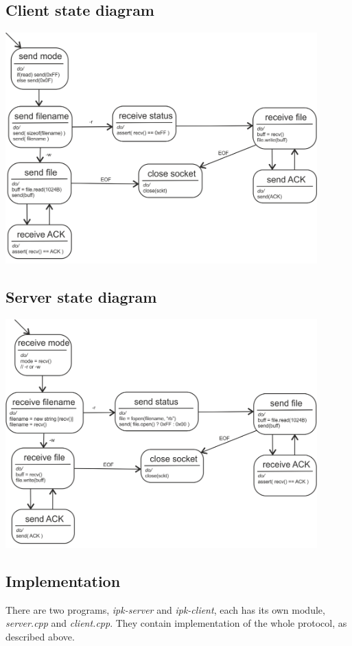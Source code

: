 \documentclass[10pt,a4paper,titlepage]{article}
\begin{document}
\subsection*{Client state diagram}

\includegraphics[width=0.9\textwidth]{state_client.png}

\subsection*{Server state diagram}

\includegraphics[width=0.9\textwidth]{state_server.png}

\subsection*{Implementation}

There are two programs, {\it ipk-server} and {\it ipk-client}, each has its
own module, {\it server.cpp} and {\it client.cpp}. They contain implementation
of the whole protocol, as described above.
\end{document}
